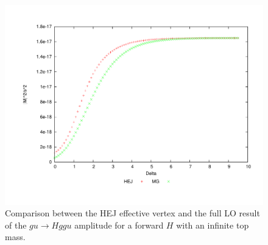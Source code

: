 \begin{figure}[t]
\centering
\includegraphics[scale=0.45]{Images/ug_nextfor.pdf}
\caption{Comparison between the HEJ effective vertex and the full LO result of the $gu \to Hggu$ amplitude for a forward $H$ with an infinite top mass.}
\label{fig:ug_for} 
\end{figure}

